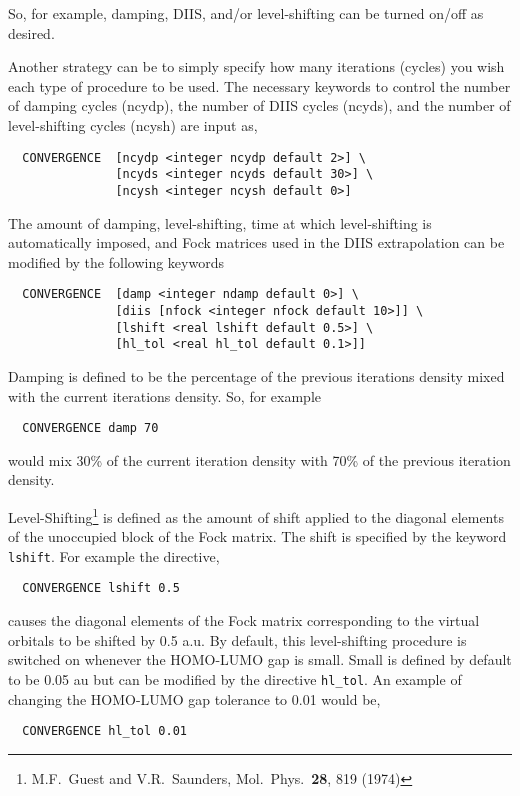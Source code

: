 So, for example, damping, DIIS, and/or level-shifting can be turned
on/off as desired.

Another strategy can be to simply specify how many iterations (cycles) you wish
each type of procedure to be used.  The necessary keywords to control
the number of damping cycles (ncydp), the number of DIIS cycles
(ncyds), and the number of level-shifting cycles (ncysh) are input as,
\begin{verbatim}
  CONVERGENCE  [ncydp <integer ncydp default 2>] \
               [ncyds <integer ncyds default 30>] \
               [ncysh <integer ncysh default 0>]
\end{verbatim}

The amount of damping, level-shifting, time at which level-shifting is
automatically imposed, and Fock matrices used in the DIIS
extrapolation can be modified by the following keywords
\begin{verbatim}
  CONVERGENCE  [damp <integer ndamp default 0>] \
               [diis [nfock <integer nfock default 10>]] \
               [lshift <real lshift default 0.5>] \
               [hl_tol <real hl_tol default 0.1>]]
\end{verbatim}

Damping is defined to be the percentage of the previous iterations
density mixed with the current iterations density.  So, for example 
\begin{verbatim}
  CONVERGENCE damp 70
\end{verbatim}
would mix 30\% of the current iteration density with 70\% of the
previous iteration density.

Level-Shifting\footnote {M.F.~Guest and 
V.R.~Saunders, Mol.~Phys.~{\bf 28}, 819 (1974)} is defined as the
amount of shift applied to the diagonal elements of the unoccupied
block of the Fock matrix.  The shift is specified by the
keyword \verb+lshift+.  For example the directive,
\begin{verbatim}
  CONVERGENCE lshift 0.5
\end{verbatim}
causes the diagonal elements of the Fock matrix
corresponding to the virtual orbitals to be shifted by 0.5 a.u.
By default, this level-shifting procedure is switched on whenever the
HOMO-LUMO gap is small.  Small is defined by default to be 0.05 au but
can be modified by the directive \verb+hl_tol+.  An example of
changing the HOMO-LUMO gap tolerance to 0.01 would be,
\begin{verbatim}
  CONVERGENCE hl_tol 0.01
\end{verbatim}


